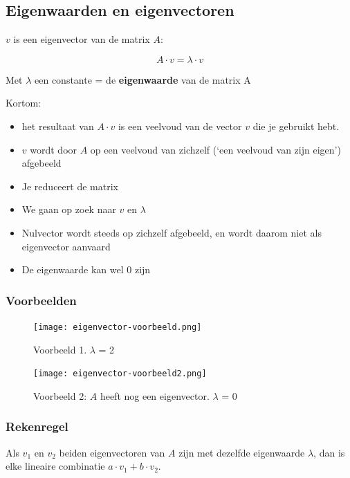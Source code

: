 \documentclass{article}
\begin{document}
\subsection{Eigenwaarden en eigenvectoren}

$v$ is een eigenvector van de matrix $A$:

\begin{equation}
    A \cdot v = \lambda \cdot v
\end{equation}

Met $\lambda$ een constante = de \textbf{eigenwaarde} van de matrix A

Kortom:

\begin{itemize}
    \item het resultaat van $A \cdot v$ is een veelvoud van de vector $v$ die je gebruikt hebt.
    \item $v$ wordt door $A$ op een veelvoud van zichzelf (`een veelvoud van zijn eigen') afgebeeld
    \item Je reduceert de matrix
    \item We gaan op zoek naar $v$ en $\lambda$
    \item Nulvector wordt steeds op zichzelf afgebeeld, en wordt daarom niet als eigenvector aanvaard
    \item De eigenwaarde kan wel $0$ zijn 
\end{itemize}

\subsubsection{Voorbeelden}

\begin{figure}[H]
    \centering
    \texttt{[image: eigenvector-voorbeeld.png]}
    \caption{Voorbeeld 1. $\lambda$ = 2}
\end{figure}

\begin{figure}[H]
    \centering
    \texttt{[image: eigenvector-voorbeeld2.png]}
    \caption{Voorbeeld 2: $A$ heeft nog een eigenvector. $\lambda$ = 0}
\end{figure}


\subsubsection{Rekenregel}

Als $v_1$ en $v_2$ beiden eigenvectoren van $A$ zijn met dezelfde eigenwaarde $\lambda$, 
dan is elke lineaire combinatie $a \cdot v_1 + b \cdot v_2$.
\end{document}
